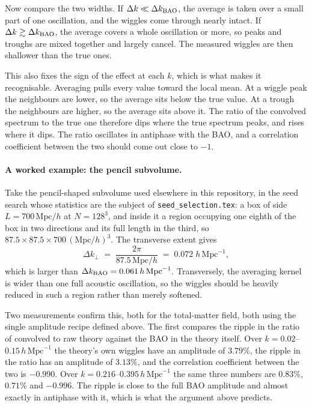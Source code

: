 \documentclass[12pt]{article}
\begin{document}
Now compare the two widths.  If $\Delta k \ll \Delta k_{\rm BAO}$, the
average is taken over a small part of one oscillation, and the wiggles come
through nearly intact.  If $\Delta k \gtrsim \Delta k_{\rm BAO}$, the
average covers a whole oscillation or more, so peaks and troughs are mixed
together and largely cancel.  The measured wiggles are then shallower than
the true ones.

This also fixes the sign of the effect at each $k$, which is what makes it
recognisable.  Averaging pulls every value toward the local mean.  At a
wiggle peak the neighbours are lower, so the average sits below the true
value.  At a trough the neighbours are higher, so the average sits above
it.  The ratio of the convolved spectrum to the true one therefore dips
where the true spectrum peaks, and rises where it dips.  The ratio
oscillates in antiphase with the BAO, and a correlation coefficient between
the two should come out close to $-1$.

\paragraph{A worked example: the pencil subvolume.}
Take the pencil-shaped subvolume used elsewhere in this repository, in the
seed search whose statistics are the subject of \texttt{seed\_selection.tex}:
a box of side $L = 700\,\mathrm{Mpc}/h$ at $N = 128^3$, and inside it a
region occupying one eighth of the box in two directions and its full length
in the third, so $87.5 \times 87.5 \times 700\,(\mathrm{Mpc}/h)^3$.  The
transverse extent gives
\begin{equation}
  \Delta k_\perp \;=\; \frac{2\pi}{87.5\,\mathrm{Mpc}/h}
  \;=\; 0.072 \; h\,\mathrm{Mpc}^{-1},
\end{equation}
which is larger than $\Delta k_{\rm BAO} = 0.061\,h\,\mathrm{Mpc}^{-1}$.
Transversely, the averaging kernel is wider than one full acoustic
oscillation, so the wiggles should be heavily reduced in such a region
rather than merely softened.

Two measurements confirm this, both for the total-matter field, both using
the single amplitude recipe defined above.  The first compares the ripple in
the ratio of convolved to raw theory against the BAO in the theory itself.
Over $k = 0.02$--$0.15\,h\,\mathrm{Mpc}^{-1}$ the theory's own wiggles have
an amplitude of $3.79\%$, the ripple in the ratio has an amplitude of
$3.13\%$, and the correlation coefficient between the two is $-0.990$.
Over $k = 0.216$--$0.395\,h\,\mathrm{Mpc}^{-1}$ the same three numbers are
$0.83\%$, $0.71\%$ and $-0.996$.  The ripple is close to the full BAO
amplitude and almost exactly in antiphase with it, which is what the
argument above predicts.
\end{document}
